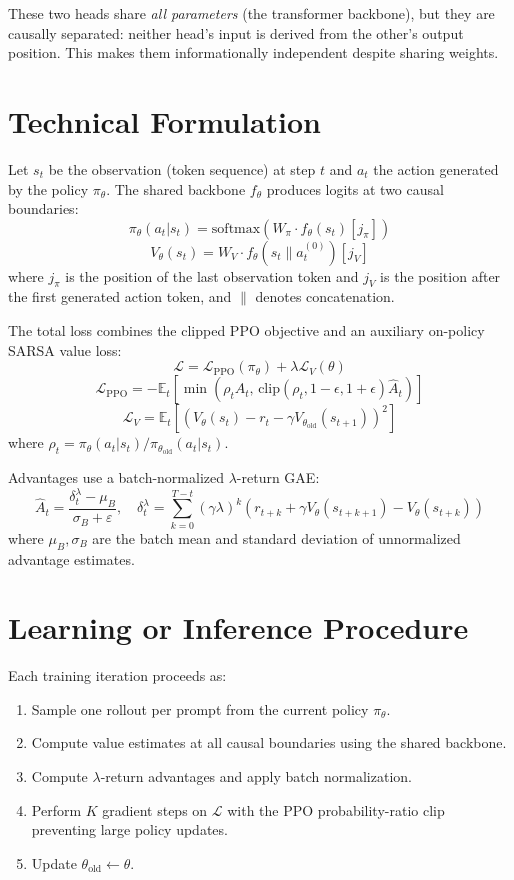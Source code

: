 \documentclass[10pt,twocolumn]{article}
\begin{document}
These two heads share \emph{all parameters} (the transformer backbone),
but they are causally separated: neither head's input is derived from
the other's output position. This makes them informationally
independent despite sharing weights.

\section{Technical Formulation}

Let $s_t$ be the observation (token sequence) at step $t$ and $a_t$ the
action generated by the policy $\pi_\theta$. The shared backbone
$f_\theta$ produces logits at two causal boundaries:
\[
  \pi_\theta(a_t | s_t) = \text{softmax}(W_\pi \cdot f_\theta(s_t)[j_\pi])
\]
\[
  V_\theta(s_t) = W_V \cdot f_\theta(s_t \| a_t^{(0)})[j_V]
\]
where $j_\pi$ is the position of the last observation token and
$j_V$ is the position after the first generated action token,
and $\|$ denotes concatenation.

The total loss combines the clipped PPO objective and an auxiliary
on-policy SARSA value loss:
\[
  \mathcal{L} = \mathcal{L}_\text{PPO}(\pi_\theta) + \lambda \mathcal{L}_V(\theta)
\]
\[
  \mathcal{L}_\text{PPO} = -\mathbb{E}_t\left[\min\!\left(
    \rho_t \hat{A}_t,\, \text{clip}(\rho_t, 1{-}\epsilon, 1{+}\epsilon)\hat{A}_t
  \right)\right]
\]
\[
  \mathcal{L}_V = \mathbb{E}_t\left[(V_\theta(s_t)
    - r_t - \gamma V_{\theta_\text{old}}(s_{t+1}))^2\right]
\]
where $\rho_t = \pi_\theta(a_t|s_t)/\pi_{\theta_\text{old}}(a_t|s_t)$.

Advantages use a batch-normalized $\lambda$-return GAE:
\[
  \hat{A}_t = \frac{\delta_t^\lambda - \mu_B}{\sigma_B + \varepsilon},
  \quad \delta_t^\lambda = \sum_{k=0}^{T-t}(\gamma\lambda)^k
    (r_{t+k} + \gamma V_\theta(s_{t+k+1}) - V_\theta(s_{t+k}))
\]
where $\mu_B, \sigma_B$ are the batch mean and standard deviation
of unnormalized advantage estimates.

\section{Learning or Inference Procedure}

Each training iteration proceeds as:
\begin{enumerate}[itemsep=2pt,parsep=0pt]
  \item Sample one rollout per prompt from the current policy $\pi_\theta$.
  \item Compute value estimates at all causal boundaries using the
    shared backbone.
  \item Compute $\lambda$-return advantages and apply batch normalization.
  \item Perform $K$ gradient steps on $\mathcal{L}$ with the PPO
    probability-ratio clip preventing large policy updates.
  \item Update $\theta_\text{old} \leftarrow \theta$.
\end{enumerate}
\end{document}
